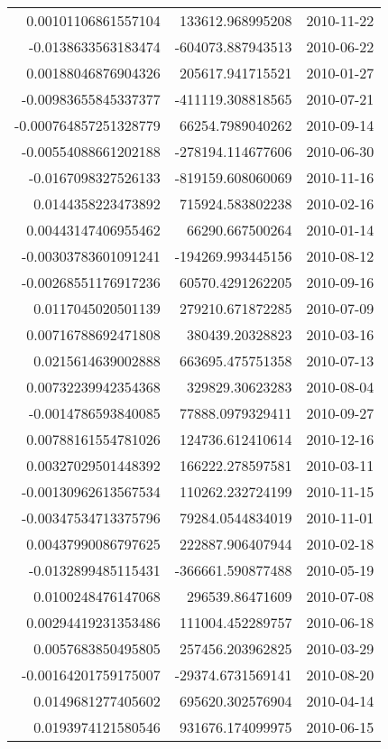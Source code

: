 \begin{tabular}{r | r | l}
0.00101106861557104 & 133612.968995208 & 2010-11-22 \\
-0.0138633563183474 & -604073.887943513 & 2010-06-22 \\
0.00188046876904326 & 205617.941715521 & 2010-01-27 \\
-0.00983655845337377 & -411119.308818565 & 2010-07-21 \\
-0.000764857251328779 & 66254.7989040262 & 2010-09-14 \\
-0.00554088661202188 & -278194.114677606 & 2010-06-30 \\
-0.0167098327526133 & -819159.608060069 & 2010-11-16 \\
0.0144358223473892 & 715924.583802238 & 2010-02-16 \\
0.00443147406955462 & 66290.667500264 & 2010-01-14 \\
-0.00303783601091241 & -194269.993445156 & 2010-08-12 \\
-0.00268551176917236 & 60570.4291262205 & 2010-09-16 \\
0.0117045020501139 & 279210.671872285 & 2010-07-09 \\
0.00716788692471808 & 380439.20328823 & 2010-03-16 \\
0.0215614639002888 & 663695.475751358 & 2010-07-13 \\
0.00732239942354368 & 329829.30623283 & 2010-08-04 \\
-0.0014786593840085 & 77888.0979329411 & 2010-09-27 \\
0.00788161554781026 & 124736.612410614 & 2010-12-16 \\
0.00327029501448392 & 166222.278597581 & 2010-03-11 \\
-0.00130962613567534 & 110262.232724199 & 2010-11-15 \\
-0.00347534713375796 & 79284.0544834019 & 2010-11-01 \\
0.00437990086797625 & 222887.906407944 & 2010-02-18 \\
-0.0132899485115431 & -366661.590877488 & 2010-05-19 \\
0.0100248476147068 & 296539.86471609 & 2010-07-08 \\
0.00294419231353486 & 111004.452289757 & 2010-06-18 \\
0.0057683850495805 & 257456.203962825 & 2010-03-29 \\
-0.00164201759175007 & -29374.6731569141 & 2010-08-20 \\
0.0149681277405602 & 695620.302576904 & 2010-04-14 \\
0.0193974121580546 & 931676.174099975 & 2010-06-15 \\

\end{tabular}
